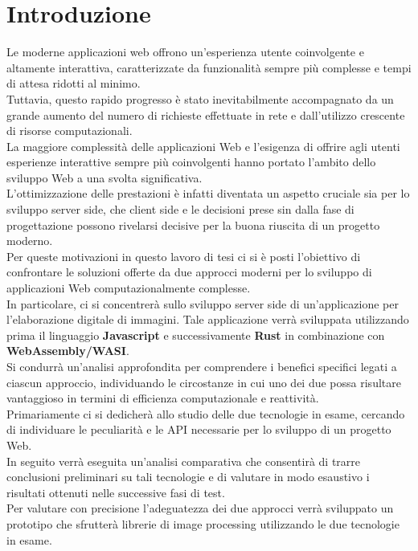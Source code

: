 \chapter*{Introduzione}
\label{Introduzione}
Le moderne applicazioni web offrono un'esperienza utente coinvolgente e altamente interattiva, caratterizzate da funzionalità sempre più complesse e tempi di attesa ridotti al minimo.
\\Tuttavia, questo rapido progresso è stato inevitabilmente accompagnato da un grande aumento del numero di richieste effettuate in rete e dall'utilizzo crescente di risorse computazionali.
\\La maggiore complessità delle applicazioni Web e l’esigenza di offrire agli utenti esperienze interattive sempre più coinvolgenti hanno portato l’ambito dello sviluppo Web a una svolta significativa.
\\L’ottimizzazione delle prestazioni è infatti diventata un aspetto cruciale sia per lo sviluppo server side, che client side e le decisioni prese sin dalla fase di progettazione possono rivelarsi decisive per la buona riuscita di un progetto moderno.
\\Per queste motivazioni in questo lavoro di tesi ci si è posti l'obiettivo di confrontare le soluzioni offerte da due approcci moderni per lo sviluppo di applicazioni Web computazionalmente complesse.
\\In particolare, ci si concentrerà sullo sviluppo server side di un'applicazione per l'elaborazione digitale di immagini.
Tale applicazione verrà sviluppata utilizzando prima il linguaggio \textbf{Javascript} e successivamente \textbf{Rust} in combinazione con \textbf{WebAssembly/WASI}.
\\Si condurrà un'analisi approfondita per comprendere i benefici specifici legati a ciascun approccio, individuando le circostanze in cui uno dei due possa risultare vantaggioso in termini di efficienza computazionale e reattività.
\\Primariamente ci si dedicherà allo studio delle due tecnologie in esame, cercando di individuare le peculiarità e le API necessarie per lo sviluppo di un progetto Web.
\\In seguito verrà eseguita un'analisi comparativa che consentirà di trarre conclusioni preliminari su tali tecnologie e di valutare in modo esaustivo i risultati ottenuti nelle successive fasi di test.
\\Per valutare con precisione l'adeguatezza dei due approcci verrà sviluppato un prototipo che sfrutterà librerie di image processing utilizzando le due tecnologie in esame.
